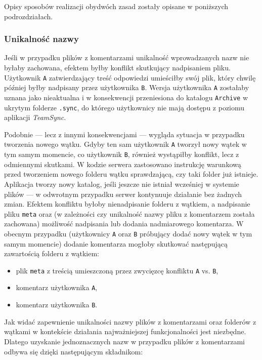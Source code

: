 \documentclass[polish,a4paper,twoside]{ppfcmthesis}
\begin{document}
Opisy sposobów realizacji obydwóch zasad zostały opisane w poniższych podrozdziałach.

\subsubsection*{Unikalność nazwy}

Jeśli w przypadku plików z komentarzami unikalność wprowadzanych nazw nie byłaby zachowana, efektem byłby konflikt skutkujący nadpisaniem pliku. Użytkownik \texttt{A} zatwierdzający treść odpowiedzi umieściłby swój plik, który chwilę później byłby nadpisany przez użytkownika \texttt{B}. Wersja użytkownika \texttt{A} zostałaby uznana jako nieaktualna i w konsekwencji przeniesiona do katalogu \texttt{Archive} w ukrytym folderze \texttt{.sync}, do którego użytkownicy nie mają dostępu z poziomu aplikacji \emph{TeamSync}.

Podobnie --- lecz z innymi konsekwencjami --- wygląda sytuacja w przypadku tworzenia nowego wątku. Gdyby ten sam użytkownik \texttt{A} tworzył nowy wątek w tym samym momencie, co użytkownik \texttt{B}, również wystąpiłby konflikt, lecz z odmiennymi skutkami. W kodzie serwera zastosowano instrukcję warunkową przed tworzeniem nowego folderu wątku sprawdzającą, czy taki folder już istnieje. Aplikacja tworzy nowy katalog, jeśli jeszcze nie istniał wcześniej w systemie plików --- w odwrotnym przypadku serwer kontynuuje działanie bez żadnych zmian. Efektem konfliktu byłoby nienadpisanie folderu z wątkiem, a nadpisanie pliku \texttt{meta} oraz (w zależności czy unikalność nazwy pliku z komentarzem została zachowana) możliwość nadpisania lub dodania nadmiarowego komentarza. W obecnym przypadku (użytkownicy \texttt{A} oraz \texttt{B} próbujący dodać nowy wątek w tym samym momencie) dodanie komentarza mogłoby skutkować następującą zawartością folderu z wątkiem:

\begin{itemize}[noitemsep]
  \item plik \texttt{meta} z treścią umieszczoną przez zwycięzcę konfliktu \texttt{A} vs. \texttt{B},
  
  \item komentarz użytkownika \texttt{A},
  
  \item komentarz użytkownika \texttt{B}.
\end{itemize}

Jak widać zapewnienie unikalności nazwy plików z komentarzami oraz folderów z wątkami w kontekście działania najważniejszej funkcjonalności jest niezbędne. Dlatego uzyskanie jednoznacznych nazw w przypadku plików z komentarzami odbywa się dzięki następującym składnikom:
\end{document}
